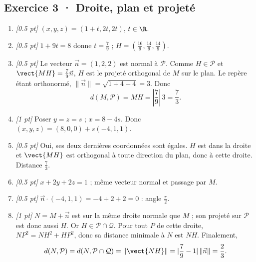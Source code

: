 \subsection*{Exercice 3 · Droite, plan et projeté}\begin{enumerate}

\item \textit{[\num{0,5} pt]} $(x,y,z)=(1+t,2t,2t)$, $t\in\R$.

\item \textit{[\num{0,5} pt]} $1+9t=8$ donne $t=\frac{7}{9}$ ; $H=(\frac{16}{9},\frac{14}{9},\frac{14}{9})$.

\item \textit{[\num{0,5} pt]} Le vecteur $\vec n=(1,2,2)$ est normal à $\mathcal P$. Comme $H\in\mathcal P$ et $\vect{MH}=\frac{7}{9}\vec n$, $H$ est le projeté orthogonal de $M$ sur le plan. Le repère étant orthonormé, $\|\vec n\|=\sqrt{1+4+4}=3$. Donc
\[d(M,\mathcal P)=MH=|\frac{7}{9}|\,3=\frac{7}{3}.\]

\item \textit{[1 pt]} Poser $y=z=s$ ; $x=8-4s$. Donc $(x,y,z)=(8,0,0)+s(-4,1,1)$.

\item \textit{[\num{0,5} pt]} Oui, ses deux dernières coordonnées sont égales. $H$ est dans la droite et $\vect{MH}$ est orthogonal à toute direction du plan, donc à cette droite. Distance $\frac{7}{3}$.

\item \textit{[\num{0,5} pt]} $x+2y+2z=1$ ; même vecteur normal et passage par $M$.

\item \textit{[\num{0,5} pt]} $\vec n\cdot(-4,1,1)=-4+2+2=0$ : angle $\frac{\pi}{2}$.

\item \textit{[1 pt]} $N=M+\vec n$ est sur la même droite normale que $M$ ; son projeté sur $\mathcal P$ est donc aussi $H$. Or $H\in\mathcal P\cap\mathcal Q$. Pour tout $P$ de cette droite, $NP^2=NH^2+HP^2$, donc sa distance minimale à $N$ est $NH$. Finalement,
\[d(N,\mathcal P)=d(N,\mathcal P\cap\mathcal Q)=\|\vect{NH}\|=|\frac{7}{9}-1|\,\|\vec n\|=\frac{2}{3}.\]

\end{enumerate}

